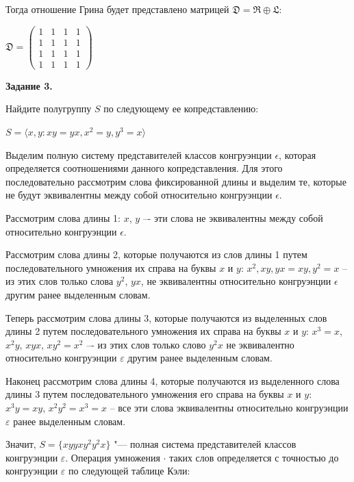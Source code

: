 \documentclass[spec, och, labwork]{shiza}
\begin{document}
    Тогда отношение Грина будет представлено матрицей $\mathfrak{D} = \mathfrak{R} \oplus \mathfrak{L}$:

    \begin{center}
      $\mathfrak{D} =
      \begin{pmatrix}
        1 & 1 & 1 & 1 \\
        1 & 1 & 1 & 1 \\
        1 & 1 & 1 & 1 \\
        1 & 1 & 1 & 1
      \end{pmatrix}$
    \end{center}

    \textbf{Задание 3.}
    
    Найдите полугруппу $S$ по следующему ее копредставлению:
    \begin{center}

      $S = \langle x,y : xy = yx, x^2 = y, y^3 = x \rangle$
    \end{center}

    Выделим полную систему представителей классов конгруэнции $\epsilon$, которая определяется соотношениями данного
    копредставления. Для этого последовательно рассмотрим слова фиксированной длины и
    выделим те, которые не будут эквивалентны между собой относительно конгруэнции $\epsilon$.

    Рассмотрим слова длины 1: $x$, $y$ –- эти слова не эквивалентны между собой относительно конгруэнции $\epsilon$.

    Рассмотрим слова длины 2, которые получаются из слов
    длины 1 путем последовательного умножения их справа на буквы $x$ и $y$: $x^2, xy, yx = xy, y^2 = x$ -- из этих 
    слов только слова $y^2$, $yx$, не эквивалентны относительно конгруэнции $\epsilon$ другим ранее выделенным словам.

    Теперь рассмотрим слова длины 3, которые получаются из выделенных слов длины 2 путем последовательного
    умножения их справа на буквы $x$ и $y$: $x^3 = x$, $x^2y$, $xyx$,  $xy^2 = x^2$  –- из этих слов только
    слово $y^2x$ не эквивалентно относительно конгруэнции $\varepsilon$ другим ранее выделенным словам.

    Наконец рассмотрим слова длины 4, которые получаются из выделенного слова длины 3 путем последовательного
    умножения его справа на буквы $x$ и $y$: $x^3y = xy$, $x^2y^2 = x^3 = x$ -- все эти слова эквивалентны
    относительно конгруэнции $\varepsilon$ ранее выделенным словам.

    Значит, $S = \{x y yx y^2 y^2x\}$ "--- полная система представителей классов конгруэнции $\varepsilon$.
    Операция умножения $\cdot$ таких слов определяется с точностью до конгруэнции $\varepsilon$ по следующей таблице
    Кэли:
\end{document}
